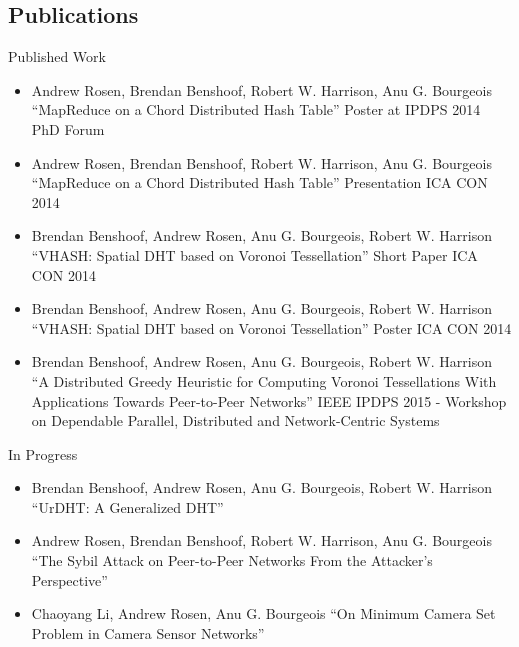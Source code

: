 \documentclass[11pt]{beamer}
\begin{document}
\subsection{Publications}
\begin{frame}{Published Work}
	\begin{itemize}
		\item Andrew Rosen, Brendan Benshoof, Robert W. Harrison, Anu G. Bourgeois ``MapReduce on a Chord Distributed Hash Table'' Poster at IPDPS 2014 PhD Forum
		\item Andrew Rosen, Brendan Benshoof, Robert W. Harrison, Anu G. Bourgeois ``MapReduce on a Chord Distributed Hash Table'' Presentation ICA CON 2014
		\item Brendan Benshoof, Andrew Rosen, Anu G. Bourgeois, Robert W. Harrison ``VHASH: Spatial DHT based on Voronoi Tessellation'' Short Paper ICA CON 2014 
		\item Brendan Benshoof, Andrew Rosen, Anu G. Bourgeois, Robert W. Harrison ``VHASH: Spatial DHT based on Voronoi Tessellation'' Poster ICA CON 2014 
		\item Brendan Benshoof, Andrew Rosen, Anu G. Bourgeois, Robert W. Harrison ``A Distributed Greedy Heuristic for Computing Voronoi Tessellations With Applications Towards Peer-to-Peer Networks'' IEEE IPDPS 2015 - Workshop on Dependable Parallel, Distributed and Network-Centric Systems 
	\end{itemize}
	
\end{frame}


\begin{frame}{In Progress}
	\begin{itemize}
		\item Brendan Benshoof, Andrew Rosen, Anu G. Bourgeois, Robert W. Harrison ``UrDHT: A Generalized DHT''
		\item Andrew Rosen, Brendan Benshoof, Robert W. Harrison, Anu G. Bourgeois ``The Sybil Attack on Peer-to-Peer Networks From the Attacker's Perspective''
		\item Chaoyang Li, Andrew Rosen, Anu G. Bourgeois ``On Minimum Camera Set Problem in Camera Sensor Networks''
	\end{itemize}
\end{frame}
\end{document}
